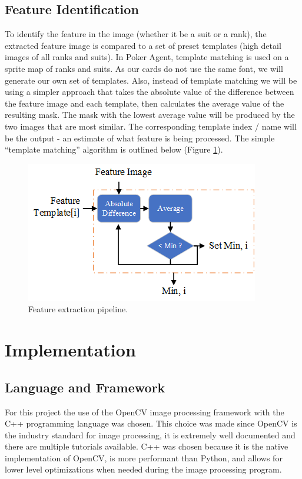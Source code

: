 \documentclass[conference]{IEEEtran}
\begin{document}
\subsection{Feature Identification}
To identify the feature in the image (whether it be a suit or a rank), the extracted feature image
is compared to a set of preset templates (high detail images of all ranks and suits). In Poker
Agent, template matching is used on a sprite map of ranks and suits. As our cards do not use the
same font, we will generate our own set of templates. Also, instead of template matching we will be
using a simpler approach that takes the absolute value of the difference between the feature image
and each template, then calculates the average value of the resulting mask. The mask with the lowest
average value will be produced by the two images that are most similar. The corresponding template
index / name will be the output - an estimate of what feature is being processed. The simple
“template matching” algorithm is outlined below (Figure \ref{fig:pipeline-feature-identification}).

\begin{figure}[htbp]
\centerline{\includegraphics[width=\columnwidth]{FeatureIdentification.png}}
\caption{Feature extraction pipeline.}
\label{fig:pipeline-feature-identification}
\end{figure}

\section{Implementation}

\subsection{Language and Framework}
For this project the use of the OpenCV image processing framework with the C++ programming language
was chosen. This choice was made since OpenCV is the industry standard for image processing, it is
extremely well documented and there are multiple tutorials available. C++ was chosen because it is
the native implementation of OpenCV, is more performant than Python, and allows for lower level
optimizations when needed during the image processing program.
\end{document}

